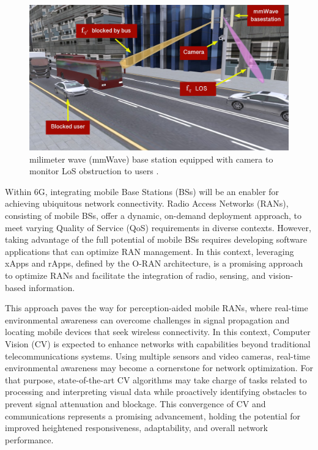 \begin{figure}[H]
    \centering
    \includegraphics[width=0.7\linewidth]{figures/urban_scenario}
    \caption[mmWave base station equipped with camera to monitor LoS obstruction to users]{milimeter wave (mmWave) base station equipped with camera to monitor LoS obstruction to users \cite{Block_predict}.}
    \label{fig:urban_scenario}
\end{figure}

Within 6G, integrating mobile Base Stations (BSs) will be an enabler for achieving ubiquitous network connectivity.
Radio Access Networks (RANs), consisting of mobile BSs, offer a dynamic, on-demand deployment approach, to meet varying Quality of Service (QoS) requirements in diverse contexts.
However, taking advantage of the full potential of mobile BSs requires developing software applications that can optimize RAN management.
In this context, leveraging xApps and rApps, defined by the O-RAN architecture, is a promising approach to optimize RANs and facilitate the integration of radio, sensing, and vision-based information.

This approach paves the way for perception-aided mobile RANs, where real-time environmental awareness can overcome challenges in signal propagation and locating mobile devices that seek wireless connectivity.
In this context, Computer Vision (CV) is expected to enhance networks with capabilities beyond traditional telecommunications systems.
Using multiple sensors and video cameras, real-time environmental awareness may become a cornerstone for network optimization.
For that purpose, state-of-the-art CV algorithms may take charge of tasks related to processing and interpreting visual data while proactively identifying obstacles to prevent signal attenuation and blockage.
This convergence of CV and communications represents a promising advancement, holding the potential for improved heightened responsiveness, adaptability, and overall network performance.

